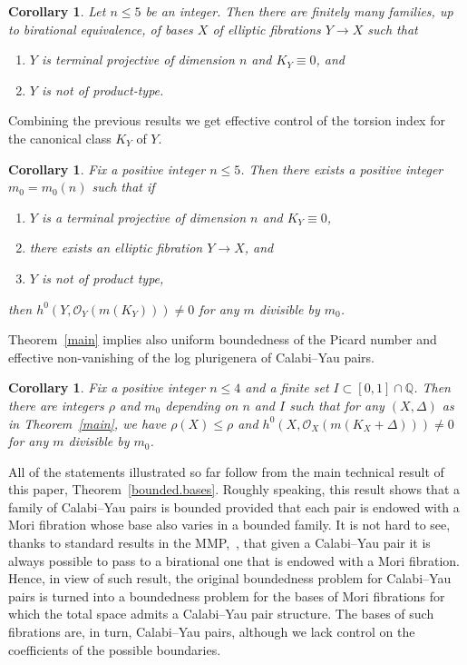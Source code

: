\documentclass{amsart}[12pt,a4paper]
\newtheorem{corollary}[theorem]{Corollary}
\theoremstyle{definition}
\newcommand{\qq}{\mathbb{Q}}
\newcommand{\oo}{\mathcal{O}}
\begin{document}
\begin{corollary}
\label{cy.fibration}
Let $n\leq 5$ be an integer. 
Then there are finitely many families, up to birational equivalence, of bases $X$ of elliptic fibrations $Y \to X$ such that
\begin{enumerate}
\item 
$Y$ is terminal projective of dimension $n$ and $K_Y \equiv 0$, and
\item 
$Y$ is not of product-type.
\end{enumerate}
\end{corollary} 

Combining the previous results we get effective control of the torsion index for the canonical class $K_Y$ of $Y$.

\begin{corollary}
\label{effective.nonvanishing}
Fix a positive integer $n\leq 5$. 
Then there exists a positive integer $m_0=m_0(n)$ such that if 
\begin{enumerate}
\item $Y$ is a terminal projective of dimension $n$ and $K_Y \equiv 0$,
\item  there exists an elliptic fibration $Y\rightarrow X$, and
\item $Y$ is not of product type,
\end{enumerate}
then $h^0(Y,\mathcal{O}_Y (m(K_Y)))\neq 0$ for any $m$ divisible by $m_0$.
\end{corollary}

Theorem~\ref{main} implies also uniform boundedness of the Picard number and effective non-vanishing of the log plurigenera of Calabi--Yau pairs.

\begin{corollary}
\label{picard}
	Fix a positive integer $n\leq 4$ and a finite set $I \subset [0,1]\cap\qq$. 
	Then there are integers $\rho$ and $m_0$ depending on $n$ and $I$ such that for any $(X,\Delta)$ as in Theorem~\ref{main}, we have $\rho(X)\leq \rho$ and $h^0(X,\oo_X (m(K_X +\Delta)))\neq 0$ for any $m$ divisible by $m_0$.
\end{corollary}

All of the statements illustrated so far follow from the main technical result of this paper, Theorem~\ref{bounded.bases}.
Roughly speaking, this result shows that a family of Calabi--Yau pairs is bounded provided that each pair is endowed with a Mori fibration whose base also varies in a bounded family. 
It is not hard to see, thanks to standard results in the MMP,~\cite{BCHM}, that given a Calabi--Yau pair it is always  possible to pass to a birational one that is endowed with a Mori fibration. 
Hence, in view of such result, the original  boundedness problem for Calabi--Yau pairs is turned into a boundedness problem for the bases of Mori fibrations for which the total space admits a Calabi--Yau pair structure.
The bases of such fibrations are, in turn, Calabi--Yau pairs, although we lack control on the coefficients of the possible boundaries.
\end{document}
